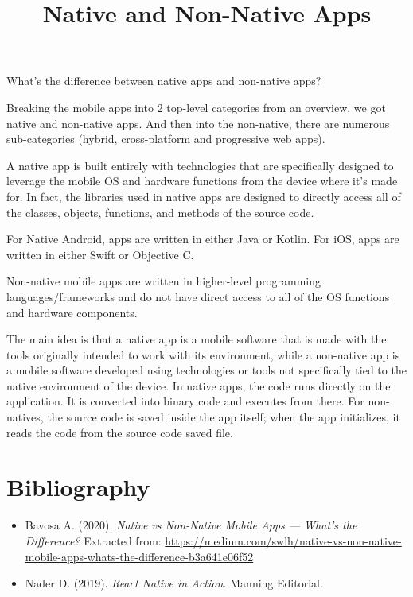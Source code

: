 \documentclass{article}
\title{Native and Non-Native Apps}
\author{}
\date{}
\begin{document}
	
	\maketitle
	
	What’s the difference between native apps and non-native apps?
	
	Breaking the mobile apps into 2 top-level categories from an overview, we got native and non-native apps. And then into the non-native, there are numerous sub-categories (hybrid, cross-platform and progressive web apps).
	
	A native app is built entirely with technologies that are specifically designed to leverage the mobile OS and hardware functions from the device where it's made for. In fact, the libraries used in native apps are designed to directly access all of the classes, objects, functions, and methods of the source code.
	
	For Native Android, apps are written in either Java or Kotlin.
	For iOS, apps are written in either Swift or Objective C.
	
	Non-native mobile apps are written in higher-level programming languages/frameworks and do not have direct access to all of the OS functions and hardware components.
	
	The main idea is that a native app is a mobile software that is made with the tools originally intended to work with its environment, while a non-native app is a mobile software developed using technologies or tools not specifically tied to the native environment of the device. In native apps, the code runs directly on the application. It is converted into binary code and executes from there. For non-natives, the source code is saved inside the app itself; when the app initializes, it reads the code from the source code saved file.
	
	\section*{Bibliography}
	\begin{itemize}
		\item Bavosa A. (2020). \textit{Native vs Non-Native Mobile Apps — What’s the Difference?} Extracted from: \url{https://medium.com/swlh/native-vs-non-native-mobile-apps-whats-the-difference-b3a641e06f52}
		\item Nader D. (2019). \textit{React Native in Action.} Manning Editorial.
	\end{itemize}
	
\end{document}
